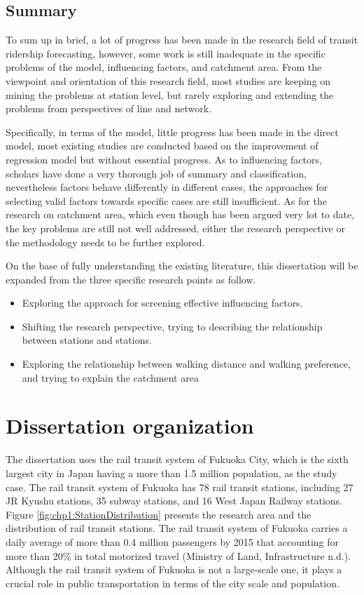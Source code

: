 %
\subsection{Summary}
To sum up in brief, a lot of progress has been made in the research field of transit ridership forecasting, however, some work is still inadequate in the specific problems of the model, influencing factors, and catchment area. From the viewpoint and orientation of this research field, most studies are keeping on mining the problems at station level, but rarely exploring and extending the problems from perspectives of line and network. 

Specifically, in terms of the model, little progress has been made in the direct model, most existing studies are conducted based on the improvement of regression model but without essential progress. As to influencing factors, scholars have done a very thorough job of summary and classification, nevertheless factors behave differently in different cases, the approaches for selecting valid factors towards specific cases are still insufficient. As for the research on catchment area, which even though has been argued very lot to date, the key problems are still not well addressed, either the research perspective or the methodology needs to be further explored.

On the base of fully understanding the existing literature, this dissertation will be expanded from the three specific research points as follow.

\begin{itemize}
	\item Exploring the approach for screening effective influencing factors.
	\item Shifting the research perspective, trying to describing the relationship between stations and stations.
	\item Exploring the relationship between walking distance and walking preference, and trying to explain the catchment area
\end{itemize}

%
\section{Dissertation organization}
The dissertation uses the rail transit system of Fukuoka City, which is the sixth largest city in Japan having a more than 1.5 million population, as the study case. The rail transit system of Fukuoka has 78 rail transit stations, including 27 JR Kyushu stations, 35 subway stations, and 16 West Japan Railway stations. Figure \ref{fig:chp1:StationDistribution} presents the research area and the distribution of rail transit stations. The rail transit system of Fukuoka carries a daily average of more than 0.4 million passengers by 2015 that accounting for more than 20\% in total motorized travel (Ministry of Land, Infrastructure n.d.). Although the rail transit system of Fukuoka is not a large-scale one, it plays a crucial role in public transportation in terms of the city scale and population.

